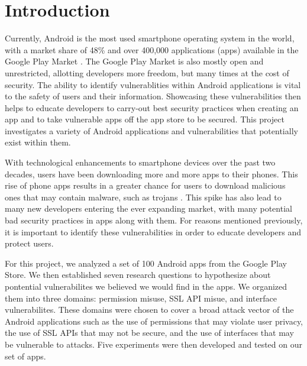 \section{Introduction}




Currently, Android is the most used smartphone operating system in the world, with a market share of 48\% and over 400,000 applications (apps) available in the Google Play Market \cite{10.1145/2382196.2382205}. The Google Play
Market is also mostly open and unrestricted, allotting developers more freedom, but many times at the cost of security. 
The ability to identify vulnerablities within Android applications is vital to the safety of users and their information. Showcasing these vulnerabilities then
helps to educate developers to carry-out best security practices when creating an app and to take vulnerable apps off the app store to be secured. This project investigates a variety of Android applications and vulnerabilities that potentially 
exist within them. 

With technological enhancements to smartphone devices over the past two decades, users have been downloading more and more apps to their phones. This rise of phone apps results in a greater chance for users to download malicious ones 
that may contain malware, such as trojans \cite{10.1145/1653662.1653691}. This spike has also lead to many new developers entering the ever expanding market, with many potential bad security practices in apps along with them. For reasons mentioned previously, 
it is important to identify these vulnerabilities in order to educate developers and protect users. 

For this project, we analyzed a set of 100 Android apps from the Google Play Store. We then established seven research questions to hypothesize about pontential vulnerabilites we believed we would find in the apps. We organized them into three domains: permission misuse, 
SSL API misue, and interface vulnerabilites. These domains were chosen to cover a broad attack vector of the Android applications such as the use of permissions that may violate user privacy, the use of SSL APIs that may not be secure, and the use of interfaces that may be vulnerable to attacks.
Five experiments were then developed and tested on our set of apps. 

